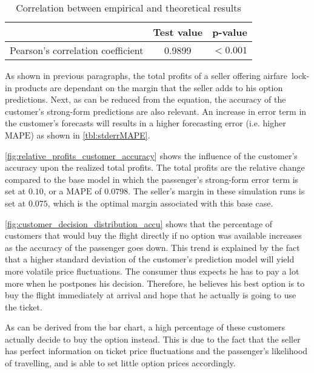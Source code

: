 \begin{table}
\centering
\begin{tabular}{l c c}
\toprule
~  &  Test value  &  p-value  \\
\midrule
Pearson's correlation coefficient   &  0.9899  &  $< 0.001$ \\
\bottomrule
\end{tabular}
\caption{Correlation between empirical and theoretical results}
\label{tbl:pearson_theory_empirical}
\end{table}



As shown in previous paragraphs, the total profits of a seller offering airfare~lock-in products are dependant on the margin that the seller adds to his option predictions. Next, as can be reduced from the equation, the accuracy of the customer's strong-form predictions are also relevant. An increase in error term in the customer's forecasts will results in a higher forecasting error (i.e. higher $\mbox{MAPE}$) as shown in \autoref{tbl:stderrMAPE}.

\autoref{fig:relative_profits_customer_accuracy} shows the influence of the customer's accuracy upon the realized total profits. The total profits are the relative change compared to the base model in which the passenger's strong-form error term is set at $0.10$, or a $\mbox{MAPE}$ of $0.0798$. The seller's margin in these simulation runs is set at $0.075$, which is the optimal margin associated with this base case.


\autoref{fig:customer_decision_distribution_accu} shows that the percentage of customers that would buy the flight directly if no option was available increases as the accuracy of the passenger goes down. This trend is explained by the fact that a higher standard deviation of the customer's prediction model will yield more volatile price fluctuations. The consumer thus expects he has to pay a lot more when he postpones his decision. Therefore, he believes his best option is to buy the flight immediately at arrival and hope that he actually is going to use the ticket.

As can be derived from the bar chart, a high percentage of these customers actually decide to buy the option instead. This is due to the fact that the seller has perfect information on ticket price fluctuations and the passenger's likelihood of travelling, and is able to set little option prices accordingly.

